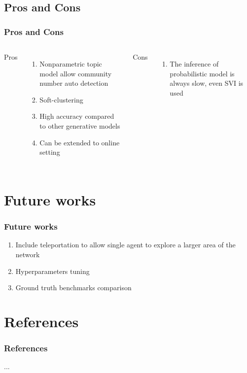 \documentclass{beamer}
\begin{document}
\subsection{Pros and Cons}
\begin{frame}
\frametitle{Pros and Cons}
\begin{columns}[t] %
	
	Pros
	\begin{enumerate}
		\item Nonparametric topic model allow community number auto detection
		\item Soft-clustering 
		\item High accuracy compared to other generative models
		\item Can be extended to online setting
	\end{enumerate}
	
	Cons
	\begin{enumerate}
		\item The inference of probabilistic model is always slow, even SVI is used
	\end{enumerate}
\end{columns}
\end{frame}



\section{Future works}
\begin{frame}
\frametitle{Future works}
\begin{enumerate}
	\item Include teleportation to allow single agent to explore a larger area of the network
	\item Hyperparameters tuning
	\item Ground truth benchmarks comparison
\end{enumerate}
\end{frame}

\section{References}
\begin{frame}
\frametitle{References}
...
\end{frame}
\end{document}
